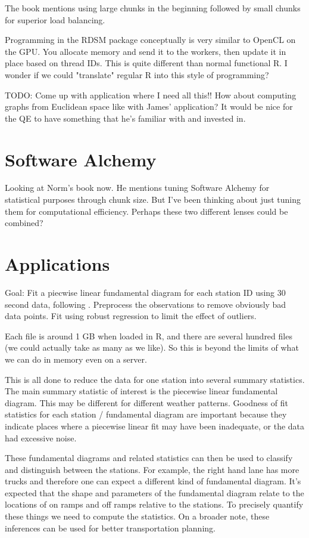 \documentclass[12pt]{article}
\begin{document}
The book mentions using large chunks in the beginning followed by small
chunks for superior load balancing.

Programming in the RDSM package conceptually is very similar to OpenCL on
the GPU. You allocate memory and send it to the workers, then update it in
place based on thread IDs. This is quite different than normal functional
R. I wonder if we could "translate" regular R into this style of
programming?

TODO: Come up with application where I need all this!! How about computing
graphs from Euclidean space like with James' application? It would be nice
for the QE to have something that he's familiar with and invested in.

\section{Software Alchemy}

Looking at Norm's book now. He mentions tuning Software Alchemy for
statistical purposes through chunk size. But I've been thinking about just
tuning them for computational efficiency. Perhaps these two different
lenses could be combined?

\section{Applications}

Goal: Fit a piecwise linear fundamental diagram for each station ID using
30 second data, following \cite{li2011fundamental}. Preprocess the
observations to remove obviously bad data points.  Fit using robust
regression to limit the effect of outliers.  

Each file is around 1 GB when loaded in R, and there are several hundred
files (we could actually take as many as we like). So this is beyond the
limits of what we can do in memory even on a server.

This is all done to reduce the data for one station into several summary
statistics. The main summary statistic of interest is the piecewise linear
fundamental diagram. This may be different for different weather patterns. 
Goodness of fit statistics for each station / fundamental diagram are
important because they indicate places where a piecewise linear fit may
have been inadequate, or the data had excessive noise.

These fundamental diagrams and related statistics can then be used to
classify and distinguish between the stations. For example, the right hand
lane has more trucks and therefore one can expect a different kind of
fundamental diagram. It's expected that the shape and parameters of the
fundamental diagram relate to the locations of on ramps and off ramps
relative to the stations. To precisely quantify these things we need to
compute the statistics. On a broader note, these inferences can be used for
better transportation planning.
\end{document}
